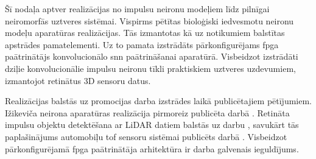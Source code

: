 
Šī nodaļa aptver realizācijas no impulsu neironu modeļiem līdz pilnīgai neiromorfās uztveres sistēmai. Vispirms pētītas
bioloģiski iedvesmotu neironu modeļu aparatūras realizācijas. Tās izmantotas kā uz notikumiem balstītas apstrādes
pamatelementi. Uz to pamata izstrādāts pārkonfigurējams \Gls{fpga} paātrinātājs konvolucionālo \Gls{snn} paātrināšanai
aparatūrā. Visbeidzot izstrādāti dziļie konvolucionālie impulsu neironu tīkli praktiskiem uztveres uzdevumiem, izmantojot
retinātus 3D sensoru datus.


Realizācijas balstās uz promocijas darba izstrādes laikā publicētajiem pētījumiem. Ižikeviča neirona aparatūras realizācija
pirmoreiz publicēta darbā \cite{lielamurs2023a}. Retināta impulsu objektu detektēšana ar LiDAR datiem balstās uz darbu
\cite{lielamurs2024}, savukārt tās paplašinājums automobiļu \Gls{tof} sensoru sistēmai publicēts darbā \cite{lielamurs2025}.
Visbeidzot pārkonfigurējamā \Gls{fpga} paātrinātāja arhitektūra ir darba \cite{lielamurs2026} galvenais ieguldījums.


